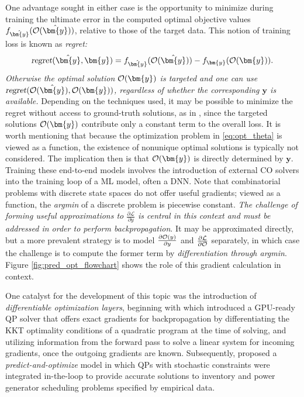 One advantage sought in either case is the opportunity to minimize during training the ultimate error in the computed optimal objective values $f_{\hat{\bm{y}}}({\cal O}(\hat{\bm{y}}))$, relative to those of the target data. This notion of training loss is known as \emph{regret:
$$
\textsl{regret}(\hat{\bm{y}},\bm{y}) = 
  f_{\hat{\bm{y}}}({\cal O}(\hat{\bm{y}}))-f_{\bm{y}}({\cal O}(\bm{y})).
$$
Otherwise the optimal solution ${\cal O}(\bm{y})$ is targeted and one can use
$\textsl{regret}({\cal O}(\hat{\bm{y}}),{\cal O}(\bm{y}))$, regardless of whether the corresponding $\bm{y}$ is available.} 
Depending on the techniques used, it may be possible to minimize the regret without access to ground-truth solutions, as in , since the targeted solutions ${\cal O}(\bm{y})$ contribute only a constant term to the overall loss.
It is worth mentioning that because the optimization problem in \eqref{eq:opt_theta} is viewed as a function, the existence of nonunique optimal solutions is typically not considered. The implication then is that ${\cal O}(\bm{y})$ is directly determined by $\bm{y}$.
Training these end-to-end models involves the introduction of external CO solvers into the training loop of a ML model, often a DNN. Note that combinatorial problems with discrete state spaces do not offer useful gradients; viewed as a function, the \emph{argmin} of a discrete problem is piecewise constant.     
\emph{The challenge of forming useful approximations to  
$\frac{\partial \mathcal{L}}{\partial y } $ is
 central in this context and must be addressed in order to perform backpropagation}. 
 It may be approximated directly, but a more prevalent strategy is to model $\frac{\partial {\cal O}(y)}{\partial y } $ and $ \frac{\partial \mathcal{L}}{\partial {\cal O}}$ separately, in which case the challenge is to compute the former term by \emph{differentiation through argmin}.  Figure \ref{fig:pred_opt_flowchart} shows the role of this gradient calculation in context.

One catalyst for the development of this topic was the introduction of \emph{differentiable optimization layers}, beginning with  which introduced a GPU-ready QP solver that offers exact gradients for backpropagation by differentiating the KKT optimality conditions of a quadratic program at the time of solving, and utilizing information from the forward pass to solve a linear system for incoming gradients, once the outgoing gradients are known. Subsequently,   proposed a \emph{predict-and-optimize} model in which QPs with stochastic constraints were integrated in-the-loop to provide accurate solutions to inventory and power generator scheduling problems specified by empirical data.

